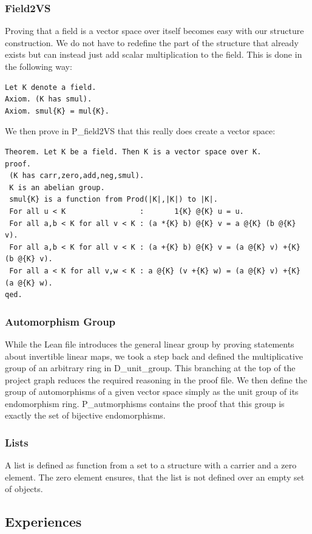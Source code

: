 \documentclass[11pt]{article}
\begin{document}
\subsubsection{Field2VS} \label{field2VS}
Proving that a field is a vector space over itself becomes easy with our structure construction. We do not have to redefine the part of the structure that already exists but can instead just add scalar multiplication to the field. This is done in the following way:
\begin{lstlisting}
Let K denote a field.
Axiom. (K has smul).
Axiom. smul{K} = mul{K}.
\end{lstlisting}
We then prove in P\_field2VS that this really does create a vector space:
\begin{lstlisting}
Theorem. Let K be a field. Then K is a vector space over K.
proof.
 (K has carr,zero,add,neg,smul).
 K is an abelian group.
 smul{K} is a function from Prod(|K|,|K|) to |K|.
 For all u < K                 :       1{K} @{K} u = u.
 For all a,b < K for all v < K : (a *{K} b) @{K} v = a @{K} (b @{K} v).
 For all a,b < K for all v < K : (a +{K} b) @{K} v = (a @{K} v) +{K} (b @{K} v).
 For all a < K for all v,w < K : a @{K} (v +{K} w) = (a @{K} v) +{K} (a @{K} w).
qed.
\end{lstlisting}


\subsubsection{Automorphism Group}
While the Lean file introduces the general linear group by proving statements about invertible linear maps, we took a step back and defined the multiplicative group of an arbitrary ring in D\_unit\_group. This branching at the top of the project graph reduces the required reasoning in the proof file.
We then define the group of automorphisms of a given vector space simply as the unit group of its endomorphism ring. P\_autmorphisms contains the proof that this group is exactly the set of bijective endomorphisms.

\subsubsection{Lists}

A list is defined as function from a set to a structure with a carrier and a zero element. The zero element ensures, that the list is not defined over an empty set of objects.


\subsection{Experiences}
\end{document}
